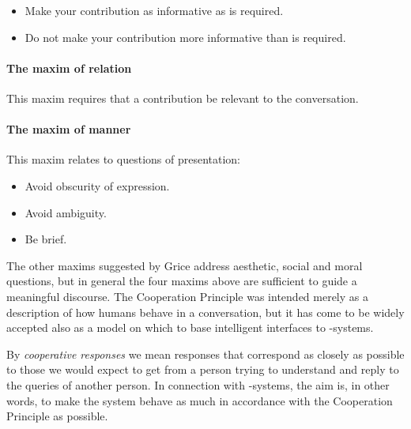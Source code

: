 \begin{itemize}
  \item Make your contribution as informative as is required.
  \item Do not make your contribution more informative than is
    required.
\end{itemize}

\paragraph{The maxim of relation} 
This maxim requires that a contribution be relevant to the
conversation.

\paragraph{The maxim of manner} 
This maxim relates to questions of presentation:

\begin{itemize}
  \item Avoid obscurity of expression.
  \item Avoid ambiguity.
  \item Be brief.
\end{itemize}

The other maxims suggested by Grice address aesthetic, social and
moral questions, but in general the four maxims above are sufficient
to guide a meaningful discourse. The Cooperation Principle was
intended merely as a description of how humans behave in a
conversation, but it has come to be widely accepted also as a model on
which to base intelligent interfaces to {\nlp}-systems.

By {\em cooperative responses\/} we mean responses that correspond as
closely as possible to those we would expect to get from a person
trying to understand and reply to the queries of another person. In
connection with {\nlp}-systems, the aim is, in other words, to make
the system behave as much in accordance with the Cooperation Principle
as possible.
